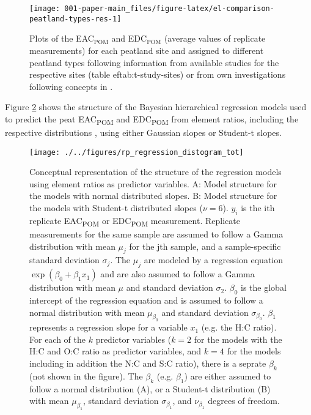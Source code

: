 \documentclass[alpha-refs]{wiley-article-rmd}
\begin{document}
\begin{refsection}
\begin{figure}[H]

{\centering \texttt{[image: 001-paper-main\_files/figure-latex/el-comparison-peatland-types-res-1]}

}

\caption{Plots of the EAC$_\text{POM}$ and EDC$_\text{POM}$ (average values of replicate measurements) for each peatland site and assigned to different peatland types following information from available studies for the respective sites (table ef{tab:t-study-sites}) or from own investigations following concepts in \textcite{Rydin.2013}.}\label{fig:el-comparison-peatland-types-res}
\end{figure}

\clearpage

Figure \ref{fig:p-reg-distogram-res} shows the structure of the Bayesian hierarchical regression models used to predict the peat EAC\textsubscript{POM} and EDC\textsubscript{POM} from element ratios, including the respective distributions \autocite{Kruschke.2015,Baath.2018}, using either Gaussian slopes or Student-t slopes.

\begin{figure}[H]

{\centering \texttt{[image: ./../figures/rp\_regression\_distogram\_tot]}

}

\caption{Conceptual representation of the structure of the regression models \cite{Kruschke.2015, Baath.2018} using element ratios as predictor variables. A: Model structure for the models with normal distributed slopes. B: Model structure for the models with Student-t distributed slopes ($\nu = 6$). $y_i$ is the ith replicate EAC\textsubscript{POM} or EDC\textsubscript{POM} measurement. Replicate measurements for the same sample are assumed to follow a Gamma distribution with mean $\mu_j$ for the jth sample, and a sample-specific standard deviation $\sigma_j$. The $\mu_j$ are modeled by a regression equation $\exp\left(\beta_0 + \beta_1 x_1\right)$ and are also assumed to follow a Gamma distribution with mean $\mu$ and standard deviation $\sigma_2$. $\beta_0$ is the global intercept of the regression equation and is assumed to follow a normal distribution with mean $\mu_{\beta_0}$ and standard deviation $\sigma_{\beta_0}$. $\beta_1$ represents a regression slope for a variable $x_1$ (e.g. the H:C ratio). For each of the $k$ predictor variables ($k=2$ for the models with the H:C and O:C ratio as predictor variables, and $k=4$ for the models including in addition the N:C and S:C ratio), there is a seprate $\beta_k$ (not shown in the figure). The $\beta_k$ (e.g. $\beta_1$) are either assumed to follow a normal distribution (A), or a Student-t distribution (B) with mean $\mu_{\beta_1}$, standard deviation $\sigma_{\beta_1}$, and $\nu_{\beta_1}$ degrees of freedom.}\label{fig:p-reg-distogram-res}
\end{figure}


\end{refsection}
\end{document}
